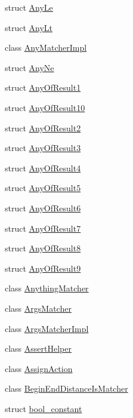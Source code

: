 \begin{DoxyCompactItemize}
\item 
struct \hyperlink{structtesting_1_1internal_1_1AnyLe}{Any\+Le}
\item 
struct \hyperlink{structtesting_1_1internal_1_1AnyLt}{Any\+Lt}
\item 
class \hyperlink{classtesting_1_1internal_1_1AnyMatcherImpl}{Any\+Matcher\+Impl}
\item 
struct \hyperlink{structtesting_1_1internal_1_1AnyNe}{Any\+Ne}
\item 
struct \hyperlink{structtesting_1_1internal_1_1AnyOfResult1}{Any\+Of\+Result1}
\item 
struct \hyperlink{structtesting_1_1internal_1_1AnyOfResult10}{Any\+Of\+Result10}
\item 
struct \hyperlink{structtesting_1_1internal_1_1AnyOfResult2}{Any\+Of\+Result2}
\item 
struct \hyperlink{structtesting_1_1internal_1_1AnyOfResult3}{Any\+Of\+Result3}
\item 
struct \hyperlink{structtesting_1_1internal_1_1AnyOfResult4}{Any\+Of\+Result4}
\item 
struct \hyperlink{structtesting_1_1internal_1_1AnyOfResult5}{Any\+Of\+Result5}
\item 
struct \hyperlink{structtesting_1_1internal_1_1AnyOfResult6}{Any\+Of\+Result6}
\item 
struct \hyperlink{structtesting_1_1internal_1_1AnyOfResult7}{Any\+Of\+Result7}
\item 
struct \hyperlink{structtesting_1_1internal_1_1AnyOfResult8}{Any\+Of\+Result8}
\item 
struct \hyperlink{structtesting_1_1internal_1_1AnyOfResult9}{Any\+Of\+Result9}
\item 
class \hyperlink{classtesting_1_1internal_1_1AnythingMatcher}{Anything\+Matcher}
\item 
class \hyperlink{classtesting_1_1internal_1_1ArgsMatcher}{Args\+Matcher}
\item 
class \hyperlink{classtesting_1_1internal_1_1ArgsMatcherImpl}{Args\+Matcher\+Impl}
\item 
class \hyperlink{classtesting_1_1internal_1_1AssertHelper}{Assert\+Helper}
\item 
class \hyperlink{classtesting_1_1internal_1_1AssignAction}{Assign\+Action}
\item 
class \hyperlink{classtesting_1_1internal_1_1BeginEndDistanceIsMatcher}{Begin\+End\+Distance\+Is\+Matcher}
\item 
struct \hyperlink{structtesting_1_1internal_1_1bool__constant}{bool\+\_\+constant}

\end{DoxyCompactItemize}
